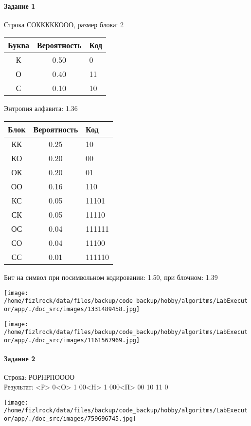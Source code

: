 \documentclass[a4paper, 12pt]{article}
\begin{document}
\paragraph{Задание 1}

Строка СОКККККООО, размер блока: 2
\begin{center}
 \begin{tabular}{ |c|c|l| } 
  \hline
     Буква & Вероятность & Код\\ \hline
К & 0.50 & 0\\\hline
О & 0.40 & 11\\\hline
С & 0.10 & 10
\\ \hline \end{tabular}
\end{center}
Энтропия алфавита: 1.36
\begin{center}
 \begin{tabular}{ |c|c|l| } 
  \hline
     Блок & Вероятность & Код\\ \hline
КК & 0.25 & 10\\\hline
КО & 0.20 & 00\\\hline
ОК & 0.20 & 01\\\hline
ОО & 0.16 & 110\\\hline
КС & 0.05 & 11101\\\hline
СК & 0.05 & 11110\\\hline
ОС & 0.04 & 111111\\\hline
СО & 0.04 & 11100\\\hline
СС & 0.01 & 111110
\\ \hline \end{tabular}
\end{center}
Бит на символ при посимвольном кодировании: 1.50, при блочном: 1.39

\texttt{[image: /home/fizlrock/data/files/backup/code\_backup/hobby/algoritms/LabExecutor/app/./doc\_src/images/1331489458.jpg]}

\texttt{[image: /home/fizlrock/data/files/backup/code\_backup/hobby/algoritms/LabExecutor/app/./doc\_src/images/1161567969.jpg]}
\pagebreak
\paragraph{Задание 2}

Строка: 
РОРНРПОООО\\
Результат: <Р> 0<О> 1 00<Н> 1 000<П> 00 10 11 0

\texttt{[image: /home/fizlrock/data/files/backup/code\_backup/hobby/algoritms/LabExecutor/app/./doc\_src/images/759696745.jpg]}
\end{document}
